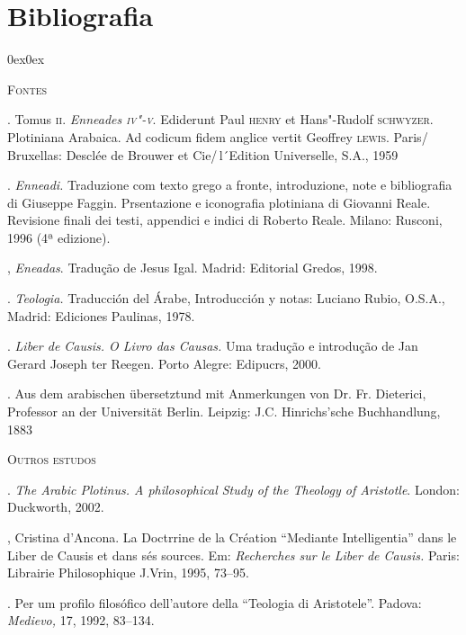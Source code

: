 \section{Bibliografia}

\begin{description}0ex\parsep0ex
\newcommand{\tit}[1]{\item[\textnormal{\textsc{\MakeTextLowercase{#1}}}]}
\newcommand{\titidem}{\item[\line(1,0){25}]}
\tit{~}

\noindent\textsc{Fontes}

\tit{PL0TINI OPERA}. Tomus \textsc{ii}. \emph{Enneades \textsc{iv"-v}}. Ediderunt Paul
\textsc{henry} et Hans"-Rudolf \textsc{schwyzer}. Plotiniana Arabaica. Ad codicum
fidem anglice vertit Geoffrey \textsc{lewis}. Paris/\,Bruxellas: Desclée de
Brouwer et Cie/\,l´Edition Universelle, S.A., 1959

\tit{PLOTINO}. \emph{Enneadi.} Traduzione com texto grego a fronte,
introduzione, note e bibliografia di Giuseppe Faggin.
Prsentazione e iconografia plotiniana di Giovanni Reale.
Revisione finali dei testi, appendici e indici di Roberto Reale.
Milano: Rusconi, 1996 (4ª edizione).

\tit{PLOTINO}, \emph{Eneadas}. Tradução de Jesus Igal. Madrid:
Editorial Gredos, 1998.

\tit{PSEUDO"-ARISTOTELES}. \emph{Teologia.} Traducción del Árabe,
Introducción y notas: Luciano Rubio, O.S.A., Madrid: Ediciones
Paulinas, 1978. 

\titidem. \emph{Liber de Causis. O Livro das Causas.} Uma
tradução e introdução de Jan Gerard Joseph ter Reegen. Porto
Alegre: Edipucrs, 2000.

\tit{THEOLOGIE DES PSEUDO ARISTOTELES, DIE SOGENANNTE}. Aus dem
arabischen übersetztund mit Anmerkungen von Dr. Fr. Dieterici,
Professor an der Universität Berlin. Leipzig: J.C. Hinrichs'sche
Buchhandlung, 1883

\medskip

\noindent\textsc{Outros estudos}

\tit{ADAMSON}. \emph{The Arabic Plotinus. A philosophical Study of
the Theology of Aristotle}. London: Duckworth, 2002.

\tit{COSTA}, Cristina d'Ancona. La Doctrrine de la Création “Mediante
Intelligentia” dans le Liber de Causis et dans sés sources. Em:
\emph{Recherches sur le Liber de Causis.} Paris: Librairie
Philosophique J.Vrin, 1995, 73--95.

\titidem.  Per um profilo filosófico dell'autore della
“Teologia di Aristotele”. Padova: \emph{Medievo,} 17, 1992,
83--134. 


\end{description}

